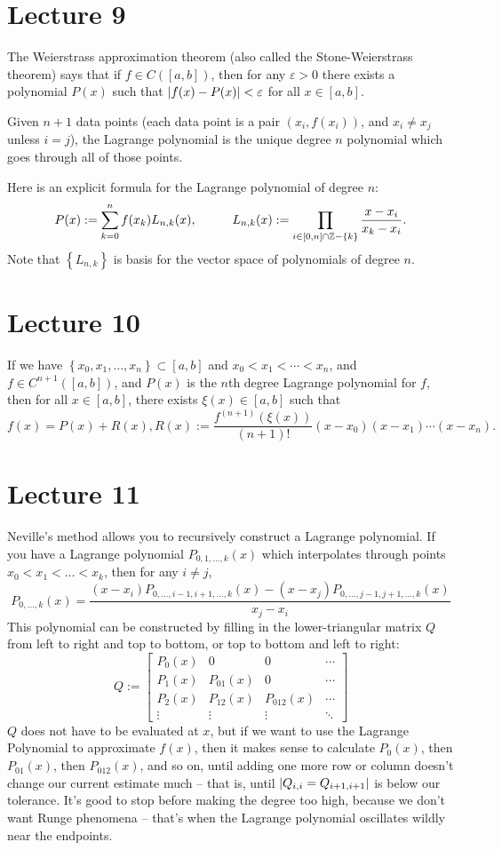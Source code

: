 \documentclass{article}
\begin{document}
\section{Lecture 9}
The Weierstrass approximation theorem (also called the Stone-Weierstrass theorem) says that if $f \in C([a,b])$, then for any $\varepsilon > 0$ there exists a polynomial $P(x)$ such that $\left\lvert f(x)-P(x) \right\rvert < \varepsilon$ for all $x \in [a,b]$.
\par
Given $n+1$ data points (each data point is a pair $(x_i, f(x_i))$, and $x_i \neq x_j$ unless $i=j$), the Lagrange polynomial is the unique degree $n$ polynomial which goes through all of those points.
\par
Here is an explicit formula for the Lagrange polynomial of degree $n$:
\[ P(x) := \sum_{k=0}^n f(x_k)L_{n,k}(x), \hspace{1cm} L_{n,k}(x) := \prod_{i \in [0,n]\cap \mathbb{Z} - \{k\}} \frac{x-x_i}{x_k-x_i}. \]
Note that $ \left\{ L_{n,k} \right\}$ is basis for the vector space of polynomials of degree $n$.

\section{Lecture 10}
If we have $ \left\{ x_0, x_1, \dots, x_n \right\} \subset [a,b]$ and $x_0 < x_1 < \cdots < x_n$, and $f \in C^{n+1}([a,b])$, and $P(x)$ is the $n$th degree Lagrange polynomial for $f$, then for all $x \in [a,b]$, there exists $\xi(x) \in [a,b]$ such that
\[ f(x) = P(x) + R(x), R(x) := \frac{f^{(n+1)}(\xi(x))}{(n+1)!}(x-x_0)(x-x_1)\cdots (x-x_n). \]

\section{Lecture 11}
Neville's method allows you to recursively construct a Lagrange polynomial. If you have a Lagrange polynomial $P_{0, 1, \dots, k}(x)$ which interpolates through points $x_0 < x_1 < \dots < x_k$, then for any $i \neq j$,
\[ P_{0,\dots,k}(x) = \frac{(x-x_i)P_{0,\dots,i-1,i+1,\dots,k}(x)-(x-x_j)P_{0,\dots,j-1,j+1,\dots,k}(x)}{x_j-x_i}\]
This polynomial can be constructed by filling in the lower-triangular matrix $Q$ from left to right and top to bottom, or top to bottom and left to right:
\[ Q := \begin{bmatrix}
    P_0(x) & 0 & 0 & \cdots \\
    P_1(x) & P_{01}(x) & 0 & \cdots \\
    P_2(x) & P_{12}(x) & P_{012}(x) & \cdots \\
    \vdots & \vdots & \vdots & \ddots
\end{bmatrix} \]
$Q$ does not have to be evaluated at $x$, but if we want to use the Lagrange Polynomial to approximate $f(x)$, then it makes sense to calculate $P_0(x)$, then $P_{01}(x)$, then $P_{012}(x)$, and so on, until adding one more row or column doesn't change our current estimate much -- that is, until $\left\lvert Q_{i,i}=Q_{i+1,i+1} \right\rvert$ is below our tolerance. It's good to stop before making the degree too high, because we don't want Runge phenomena -- that's when the Lagrange polynomial oscillates wildly near the endpoints.
\end{document}

